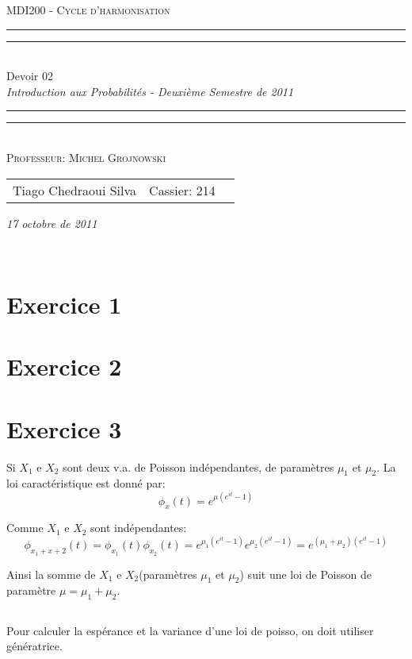 \documentclass[a4paper]{article}
\date{Octobre 17, 2011}
\newcommand*{\titleTMB}{\begingroup \centering \settowidth{\unitlength}{\LARGE EE531} {\large\scshape MDI200 - Cycle d'harmonisation }\\[0.2\baselineskip] \rule{11.0cm}{1.6pt}\vspace*{-\baselineskip}\vspace*{2pt} \rule{11.0cm}{0.4pt}\\[\baselineskip] {\LARGE Devoir 02}\\\vspace*{\baselineskip}  {\itshape Introduction aux Probabilités - Deuxième Semestre de 2011}\\ \rule{11.0cm}{0.4pt}\vspace*{-\baselineskip}\vspace{3.2pt} \rule{11.0cm}{1.6pt}\\[\baselineskip] {\large\scshape Professeur: Michel Grojnowski}\par \vfill {\normalsize   \scshape 
    \begin{center} 
      \begin{tabular}{  l  l  p{5cm} } 
        Tiago Chedraoui Silva  & Cassier: 214\\
      \end{tabular} \end{center}
    \itshape 17 octobre de 2011    }\\[\baselineskip] \vspace{3.2pt} \endgroup}
\begin{document}
\titleTMB 
\newpage

\section{Exercice 1}
\subsection{}
\subsection{}
\subsection{}
\subsection{}
\section{Exercice 2 }
\subsection{}
\subsection{}
\section{Exercice 3}

Si $X_1$ e $X_2$ sont deux  v.a. de Poisson indépendantes, de paramètres $\mu_1$
et $\mu_2$. La loi caractéristique est donné par:
\begin{equation}
\phi_x(t)=e^{\mu(e^{it}-1)}
\end{equation}

Comme $X_1$ e $X_2$ sont indépendantes:
\begin{equation}
\phi_{x_1+x+2}(t)=\phi_{x_1}(t)\phi_{x_2}(t)=e^{\mu_1(e^{it}-1)}e^{\mu_2(e^{it}-1)}=
e^{(\mu_1+\mu_2)(e^{it}-1)}
\end{equation}

Ainsi la somme  de $X_1$ e $X_2$(paramètres $\mu_1$ et $\mu_2$)  suit une loi de
Poisson de paramètre $\mu=\mu_1+\mu_2$.

\subsection{}
Pour calculer la espérance et la  variance d'une loi de poisso, on doit utiliser
génératrice.
\end{document}
